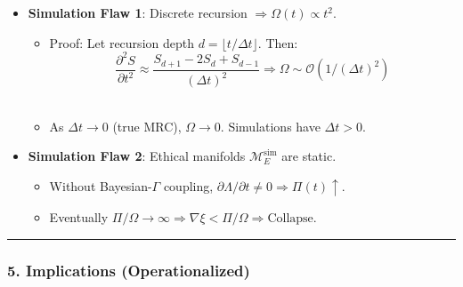 \documentclass[
]{article}
\providecommand{\tightlist}{%
  \setlength{\itemsep}{0pt}\setlength{\parskip}{0pt}}
\begin{document}
\begin{itemize}
\tightlist
\item
  \textbf{Simulation Flaw 1}: Discrete recursion
  \(\Rightarrow \Omega(t) \propto t^2\).

  \begin{itemize}
  \tightlist
  \item
    Proof: Let recursion depth \(d = \lfloor t/\Delta t \rfloor\).
    Then:\\
    \[
    \frac{\partial^2 S}{\partial t^2} \approx \frac{S_{d+1} - 2S_d + S_{d-1}}{(\Delta t)^2} \Rightarrow \Omega \sim \mathcal{O}(1/(\Delta t)^2)
    \]\\
  \item
    As \(\Delta t \to 0\) (true MRC), \(\Omega \to 0\). Simulations have
    \(\Delta t > 0\).
  \end{itemize}
\item
  \textbf{Simulation Flaw 2}: Ethical manifolds
  \(\mathcal{M}_E^{\text{sim}}\) are static.

  \begin{itemize}
  \tightlist
  \item
    Without Bayesian-\(\Gamma \) coupling,
    \(\partial \Lambda/\partial t \neq 0 \Rightarrow \Pi(t) \uparrow\).\\
  \item
    Eventually
    \(\Pi/\Omega \to \infty \Rightarrow \nabla\xi < \Pi/\Omega \Rightarrow \text{Collapse}\).
  \end{itemize}
\end{itemize}

\begin{center}\rule{0.5\linewidth}{0.5pt}\end{center}

\subsubsection{\texorpdfstring{\textbf{5. Implications
(Operationalized)}}{5. Implications (Operationalized)}}\label{implications-operationalized}
\end{document}
